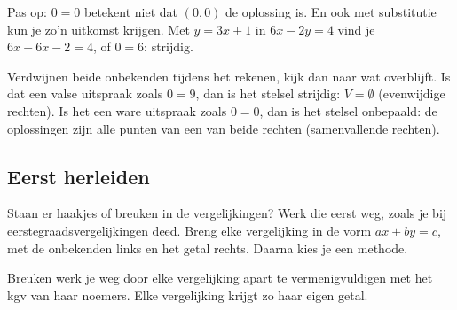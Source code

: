 Pas op: $0 = 0$ betekent niet dat $(0, 0)$ de oplossing is. En ook met substitutie kun je zo'n uitkomst krijgen. Met $y = 3x + 1$ in $6x - 2y = 4$ vind je $6x - 6x - 2 = 4$, of $0 = 6$: strijdig.

\begin{werkwijze}
Verdwijnen beide onbekenden tijdens het rekenen, kijk dan naar wat overblijft. Is dat een valse uitspraak zoals $0 = 9$, dan is het stelsel strijdig: $V = \emptyset$ (evenwijdige rechten). Is het een ware uitspraak zoals $0 = 0$, dan is het stelsel onbepaald: de oplossingen zijn alle punten van een van beide rechten (samenvallende rechten).
\end{werkwijze}

\begin{oefeningen}
\end{oefeningen}

\subsection{Eerst herleiden}

Staan er haakjes of breuken in de vergelijkingen? Werk die eerst weg, zoals je bij eerstegraadsvergelijkingen deed. Breng elke vergelijking in de vorm $ax + by = c$, met de onbekenden links en het getal rechts. Daarna kies je een methode.


Breuken werk je weg door elke vergelijking apart te vermenigvuldigen met het kgv van haar noemers. Elke vergelijking krijgt zo haar eigen getal.

